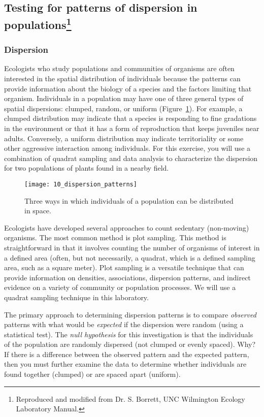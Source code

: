 \documentclass[12pt, hidelinks]{exam}
\begin{document}
\subsection*{Testing for patterns of dispersion in populations\footnote{Reproduced and modified from Dr. S. Borrett, UNC Wilmington Ecology Laboratory Manual.}}

\subsubsection*{Dispersion}

Ecologists who study populations and communities of
organisms are often interested in the spatial distribution of
individuals because the patterns can provide information
about the biology of a species and the factors limiting that
organism. Individuals in a population may have one of three general
types of spatial dispersions: clumped, random, or uniform (Figure~\ref{fig:dispersion_patterns}).
For example, a clumped distribution may indicate that a species is
responding to fine gradations in the environment or that it has a form
of reproduction that keeps juveniles near adults. Conversely, a uniform
distribution may indicate territoriality or some other aggressive
interaction among individuals. For this exercise, you will use a
combination of quadrat sampling and data analysis to characterize the
dispersion for two populations of plants found in a nearby field.

\begin{figure}[h!]
	\begin{center}
	\texttt{[image: 10\_dispersion\_patterns]}
	\caption{Three ways in which individuals of a population can be
distributed in space.}\label{fig:dispersion_patterns}
	\end{center}
\end{figure}

Ecologists have developed several approaches to count sedentary (non-moving)
 organisms. The most common method is plot sampling. This
method is straightforward in that it involves counting the number of
organisms of interest in a defined area (often, but not necessarily, a
quadrat, which is a defined sampling area, such as a square meter). 
Plot sampling is a versatile technique that can provide
information on densities, associations, dispersion patterns, and
indirect evidence on a variety of community or population processes. We
will use a quadrat sampling technique in this laboratory.

The primary approach to determining dispersion patterns is to compare
\emph{observed} patterns with what would be \emph{expected} if the
dispersion were random (using a statistical test). The \emph{null
hypothesis} for this investigation is that the individuals of the
population are randomly dispersed (not clumped or evenly spaced). Why?
If there is a difference between the observed pattern and the expected
pattern, then you must further examine the data to determine whether
individuals are found together (clumped) or are spaced apart (uniform).
\end{document}
